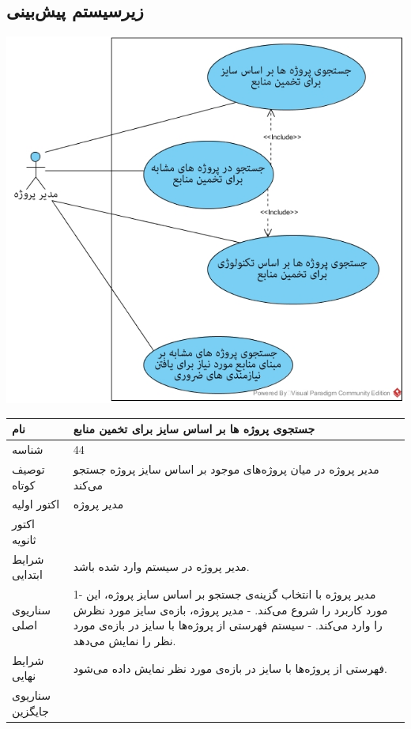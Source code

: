 \documentclass{article}
\begin{document}
\newpage
\subsection{زیرسیستم پیش‌بینی}

\vspace{2cm}
\begin{center}
\includegraphics[width=\textwidth]{Diagrams/Anticipating.jpg}
\end{center}


\newpage
\begin{tabular}{|p{2cm}|p{10cm}|}
\hline
نام
&
جستجوی پروژه ها بر اساس سایز برای تخمین منابع
\\
\hline
شناسه
&
44
\\
\hline
توصیف کوتاه
&
مدیر پروژه در میان پروژه‌های موجود بر اساس سایز پروژه جستجو می‌کند 
\\
\hline
اکتور اولیه
&
مدیر پروژه
\\
\hline
اکتور ثانویه
&

\\
\hline
شرایط ابتدایی
&
مدیر پروژه در سیستم وارد شده باشد.
\\
\hline
سناریوی اصلی
&
1- مدیر پروژه با انتخاب گزینه‌ی جستجو بر اساس سایز پروژه، این مورد کاربرد را شروع می‌کند.
\newline
2- مدیر پروژه، بازه‌ی سایز مورد نظرش را وارد می‌کند.
\newline
3- سیستم فهرستی از پروژه‌ها با سایز در بازه‌ی مورد نظر را نمایش می‌دهد.
\\
\hline
شرایط نهایی
&
فهرستی از پروژه‌ها با سایز در بازه‌ی مورد نظر نمایش داده می‌شود.
\\
\hline
سناریوی جایگزین
&

\\
\hline
\end{tabular}
\end{document}
